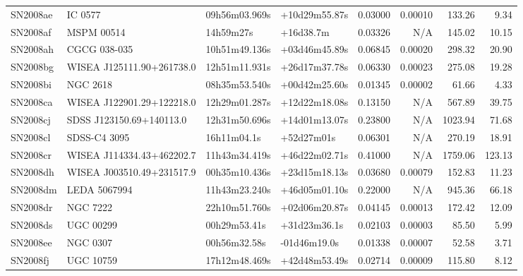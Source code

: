 \begin{longtable}{llllrrrr}
SN2008ae         &                         IC 0577 &   09h56m03.969s &   +10d29m55.87s &  0.03000 &  0.00010 &   133.26 &        9.34 \\
SN2008af         &                      MSPM 00514 &       14h59m27s &       +16d38.7m &  0.03326 &      N/A &   145.02 &       10.15 \\
SN2008ah         &                    CGCG 038-035 &   10h51m49.136s &   +03d46m45.89s &  0.06845 &  0.00020 &   298.32 &       20.90 \\
SN2008bg         &       WISEA J125111.90+261738.0 &   12h51m11.931s &   +26d17m37.78s &  0.06330 &  0.00023 &   275.08 &       19.28 \\
SN2008bi         &                        NGC 2618 &   08h35m53.540s &   +00d42m25.60s &  0.01345 &  0.00002 &    61.66 &        4.33 \\
SN2008ca         &       WISEA J122901.29+122218.0 &   12h29m01.287s &   +12d22m18.08s &  0.13150 &      N/A &   567.89 &       39.75 \\
SN2008cj         &        SDSS J123150.69+140113.0 &   12h31m50.696s &   +14d01m13.07s &  0.23800 &      N/A &  1023.94 &       71.68 \\
SN2008cl         &                    SDSS-C4 3095 &     16h11m04.1s &      +52d27m01s &  0.06301 &      N/A &   270.19 &       18.91 \\
SN2008cr         &       WISEA J114334.43+462202.7 &   11h43m34.419s &   +46d22m02.71s &  0.41000 &      N/A &  1759.06 &      123.13 \\
SN2008dh         &       WISEA J003510.49+231517.9 &   00h35m10.436s &   +23d15m18.13s &  0.03680 &  0.00079 &   152.83 &       11.23 \\
SN2008dm         &                    LEDA 5067994 &   11h43m23.240s &   +46d05m01.10s &  0.22000 &      N/A &   945.36 &       66.18 \\
SN2008dr         &                        NGC 7222 &   22h10m51.760s &   +02d06m20.87s &  0.04145 &  0.00013 &   172.42 &       12.09 \\
SN2008ds         &                       UGC 00299 &    00h29m53.41s &    +31d23m36.1s &  0.02103 &  0.00003 &    85.50 &        5.99 \\
SN2008ee         &                        NGC 0307 &    00h56m32.58s &    -01d46m19.0s &  0.01338 &  0.00007 &    52.58 &        3.71 \\
SN2008fj         &                       UGC 10759 &   17h12m48.469s &   +42d48m53.49s &  0.02714 &  0.00009 &   115.80 &        8.12 \\

\end{longtable}
